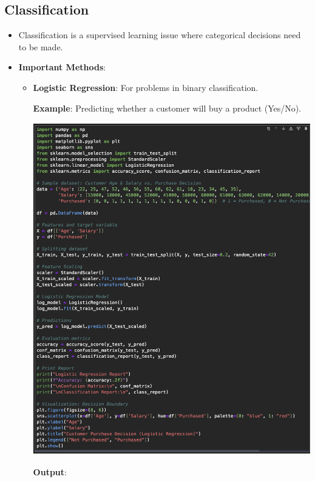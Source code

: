\documentclass{article}
\begin{document}
\subsection{Classification}
\begin{itemize}
    \item Classification is a supervised learning issue where categorical decisions need to be made.
    \item \textbf{Important Methods}:
    \begin{itemize}
    \item \textbf{Logistic Regression}: For problems in binary classification.

    \textbf{Example}: Predicting whether a customer will buy a product (Yes/No).

    \includegraphics[width=14cm,height=14.5cm]{Logistic .png}

\newpage
\textbf{Output}:


\end{itemize}
\end{itemize}
\end{document}
